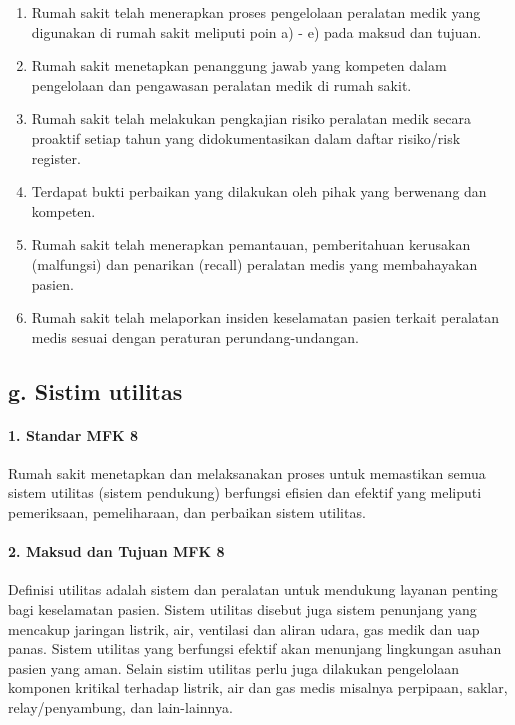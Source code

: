 \documentclass[
]{book}
\providecommand{\tightlist}{%
  \setlength{\itemsep}{0pt}\setlength{\parskip}{0pt}}
\begin{document}
\begin{enumerate}
\def\labelenumi{\alph{enumi}.}
\tightlist
\item
  Rumah sakit telah menerapkan proses pengelolaan peralatan medik yang digunakan di rumah sakit meliputi poin a) - e) pada maksud dan tujuan.
\item
  Rumah sakit menetapkan penanggung jawab yang kompeten dalam pengelolaan dan pengawasan peralatan medik di rumah sakit.
\item
  Rumah sakit telah melakukan pengkajian risiko peralatan medik secara proaktif setiap tahun yang didokumentasikan dalam daftar risiko/risk register.
\item
  Terdapat bukti perbaikan yang dilakukan oleh pihak yang berwenang dan kompeten.
\item
  Rumah sakit telah menerapkan pemantauan, pemberitahuan kerusakan (malfungsi) dan penarikan (recall) peralatan medis yang membahayakan pasien.
\item
  Rumah sakit telah melaporkan insiden keselamatan pasien terkait peralatan medis sesuai dengan peraturan perundang-undangan.
\end{enumerate}

\hypertarget{g.-sistim-utilitas}{%
\subsection*{g. Sistim utilitas}\label{g.-sistim-utilitas}}

\hypertarget{standar-mfk-8}{%
\paragraph*{1. Standar MFK 8}\label{standar-mfk-8}}

Rumah sakit menetapkan dan melaksanakan proses untuk memastikan semua sistem utilitas (sistem pendukung) berfungsi efisien dan efektif yang meliputi pemeriksaan, pemeliharaan, dan perbaikan sistem utilitas.

\hypertarget{maksud-dan-tujuan-mfk-8}{%
\paragraph*{2. Maksud dan Tujuan MFK 8}\label{maksud-dan-tujuan-mfk-8}}

Definisi utilitas adalah sistem dan peralatan untuk mendukung layanan penting bagi keselamatan pasien. Sistem utilitas disebut juga sistem penunjang yang mencakup jaringan listrik, air, ventilasi dan aliran udara, gas medik dan uap panas. Sistem utilitas yang berfungsi efektif akan menunjang lingkungan asuhan pasien yang aman. Selain sistim utilitas perlu juga dilakukan pengelolaan komponen kritikal terhadap listrik, air dan gas medis misalnya perpipaan, saklar, relay/penyambung, dan lain-lainnya.
\end{document}
